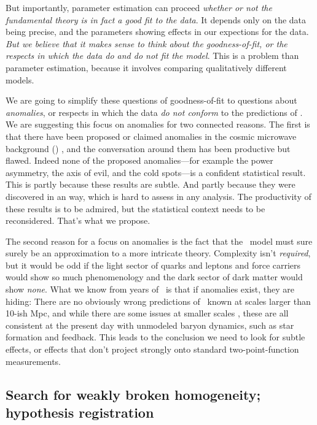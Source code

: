 \documentclass[12pt, fullpage, letterpaper]{article}
\begin{document}
But importantly,
parameter estimation can proceed \emph{whether or not the fundamental theory
is in fact a good fit to the data}.
It depends only on the data being precise, and the parameters showing
effects in our expections for the data.
\emph{But we believe that it makes sense to think about the goodness-of-fit,
or the respects in which the data do and do not fit the model}.
This is a problem than parameter estimation, because it involves comparing qualitatively different models.

We are going to simplify these questions of goodness-of-fit to questions about
\emph{anomalies}, or respects in which the data \emph{do not conform}
to the predictions of \LCDM.
We are suggesting this focus on anomalies for two connected reasons.
The first is that there have been proposed or claimed anomalies in the
cosmic microwave background (\CMB) \citep{Huterer2010}, and the conversation around them has been
productive but flawed.
Indeed none of the proposed anomalies---for example the power
asymmetry, the axis of evil, and the cold
spots---is a confident statistical result.
This is partly because these results are subtle.
And partly because they were discovered in an  way, which is hard to
assess in any  analysis.
The productivity of these results is to be admired, but the statistical
context needs to be reconsidered.
That's what we propose.

The second reason for a focus on anomalies is the fact that the \LCDM\ model must sure surely be an approximation to a more intricate theory.
Complexity isn't \emph{required}, but it would be odd if the light sector of quarks and leptons and
force carriers would show so much phenomenology and the dark sector of
dark matter would show \emph{none}.
What we know from years of \LCDM\ is that if anomalies exist, they are
hiding: There are no obviously wrong predictions of \LCDM\ known at
scales larger than 10-ish Mpc, and while there are some issues at smaller scales \citep{Bullock2017}, these are
all consistent at the present day with unmodeled baryon dynamics, such as star formation and feedback.
This leads to the conclusion we need to look for subtle effects, or effects that
don't project strongly onto standard two-point-function measurements.

\subsection{Search for weakly broken homogeneity; hypothesis registration}
\end{document}
